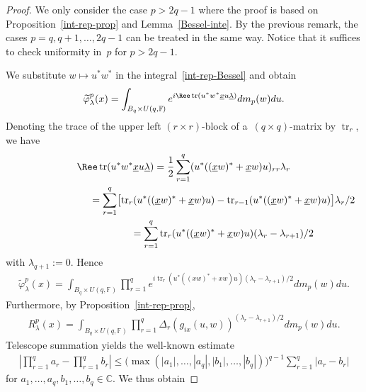 \begin{proof}
We only consider the case $p>2q-1$ where the proof is based on Proposition~\ref{int-rep-prop} and
Lemma~\ref{Bessel-inte}.
By the previous remark, the cases $p={q,q+1,\ldots,2q-1}$ can be treated in the same way.
Notice that it suf\/f\/ices to check uniformity in~$p$ for $p>2q-1$.

We substitute $w\mapsto u^*w^*$ in the integral~\eqref{int-rep-Bessel} and obtain
\begin{gather*}
\widetilde\varphi_\lambda^{p}(x)= \int_{B_q\times U(q, \mathbb F)} e^{i \Ree \operatorname{tr}(u^* w^*\underline x u\underline \lambda )}dm_p(w)du.
\end{gather*}
Denoting the trace of the upper left $(r\times r)$-block of a~$(q\times q)$-matrix by $\operatorname{tr}_r$, we have
\begin{gather*}
\Ree \operatorname{tr}(u^* w^*\underline x u\underline\lambda)
=\frac{1}{2} \sum\limits_{r=1}^q (u^*((\underline x w)^*+\underline x w)u)_{rr}  \lambda_r
\\
\phantom{\Ree \operatorname{tr}(u^* w^*\underline x u\underline\lambda)}{}
=\sum\limits_{r=1}^q \bigl[ \operatorname{tr}_r(u^*((\underline xw)^*+\underline xw)u) - \operatorname{tr}_{r-1}(u^*((\underline xw)^*+\underline xw)u)\bigr]   \lambda_r/2
\\
\phantom{\Ree \operatorname{tr}(u^* w^*\underline x u\underline\lambda)}{}
=\sum\limits_{r=1}^q \operatorname{tr}_r(u^*((\underline xw)^*+ \underline xw)u)  (\lambda_r-\lambda_{r+1})/2
\end{gather*}
with $\lambda_{q+1}:=0$.
Hence
\begin{gather*}
\widetilde\varphi_\lambda^{p}(x)
=\int_{B_q\times U(q,\mathbb F)} \prod\limits_{r=1}^q e^{i  \operatorname{tr}_r(u^*((xw)^*+xw)u) (\lambda_r-\lambda_{r+1})/2} dm_p(w)du.
\end{gather*}
Furthermore, by Proposition~\ref{int-rep-prop},
\begin{gather*}
R_{\lambda}^p(x)=\int_{B_q\times U(q,\mathbb F)} \prod\limits_{r=1}^q\Delta_r(g_{ix}(u,w))^{(\lambda_r-\lambda_{r+1})/2} dm_p(w)du.
\end{gather*}
Telescope summation yields the well-known estimate
\begin{gather*}
\left|\prod\limits_{r=1}^q a_r
-\prod\limits_{r=1}^q b_r\right|\le\big(\max(|a_1|,\ldots,|a_q|,|b_1|,\ldots, |b_q|)\big)^{q-1}  \sum\limits_{r=1}^q|a_r-b_r|
\end{gather*}
for $a_1,\ldots,a_q,b_1,\ldots,b_q\in \mathbb C$.
We thus obtain

\end{proof}
